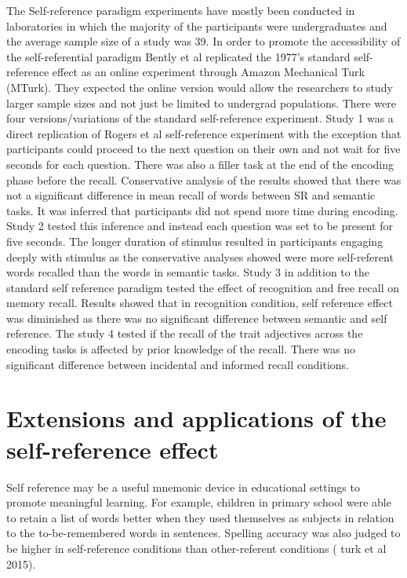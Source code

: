 \documentclass[
  man,floatsintext]{apa6}
\begin{document}
The Self-reference paradigm experiments have mostly been conducted in laboratories in which the majority of the participants were undergraduates and the average sample size of a study was 39. In order to promote the accessibility of the self-referential paradigm Bently et al replicated the 1977's standard self-reference effect as an online experiment through Amazon Mechanical Turk (MTurk). They expected the online version would allow the researchers to study larger sample sizes and not just be limited to undergrad populations. There were four versions/variations of the standard self-reference experiment. Study 1 was a direct replication of Rogers et al self-reference experiment with the exception that participants could proceed to the next question on their own and not wait for five seconds for each question. There was also a filler task at the end of the encoding phase before the recall. Conservative analysis of the results showed that there was not a significant difference in mean recall of words between SR and semantic tasks. It was inferred that participants did not spend more time during encoding. Study 2 tested this inference and instead each question was set to be present for five seconds. The longer duration of stimulus resulted in participants engaging deeply with stimulus as the conservative analyses showed were more self-referent words recalled than the words in semantic tasks. Study 3 in addition to the standard self reference paradigm tested the effect of recognition and free recall on memory recall. Results showed that in recognition condition, self reference effect was diminished as there was no significant difference between semantic and self reference. The study 4 tested if the recall of the trait adjectives across the encoding tasks is affected by prior knowledge of the recall. There was no significant difference between incidental and informed recall conditions.

\hypertarget{extensions-and-applications-of-the-self-reference-effect}{%
\section{Extensions and applications of the self-reference effect}\label{extensions-and-applications-of-the-self-reference-effect}}

Self reference may be a useful mnemonic device in educational settings to promote meaningful learning. For example, children in primary school were able to retain a list of words better when they used themselves as subjects in relation to the to-be-remembered words in sentences. Spelling accuracy was also judged to be higher in self-reference conditions than other-referent conditions ( turk et al 2015).
\end{document}
